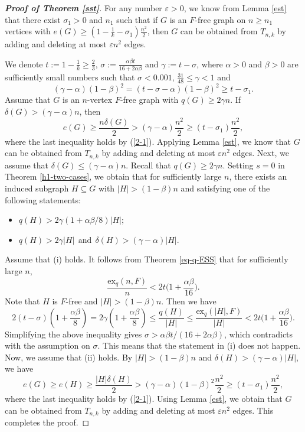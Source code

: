 \documentclass[11pt,a4paper]{article}
\theoremstyle{plain}
\theoremstyle{definition}
\begin{document}
\begin{proof}[{\bf Proof of Theorem \ref{sst}}]
For any number $\varepsilon>0$, we know from Lemma \ref{est} that there exist $\sigma_{1}>0$ and $n_{1}$ such that if
$G$ is an $F$-free graph on $n\ge n_1$ vertices with 
$e(G)\geq(1- \frac{1}{k} -\sigma_{1})\frac{n^{2}}{2}$, then
$G$ can be obtained from $T_{n,k}$ by adding and deleting at most $\varepsilon n^2$ edges.  

We denote $t:=1- \frac{1}{k}\geq \frac{2}{3}$, 
$ \sigma := \frac{\alpha\beta t}{16+2\alpha\beta}$ and $\gamma :=t-\sigma$, where $\alpha>0$ and $\beta>0$ are sufficiently small numbers such that $\sigma < 0.001$, $ \frac{31}{48}\le \gamma <1$ and  
\begin{equation}  \label{2-1}
    (\gamma -\alpha)(1-\beta)^{2} 
  = (t-\sigma - \alpha)(1- \beta)^2 \geq t-\sigma_{1}. 
\end{equation}  
Assume that $G$ is an $n$-vertex $F$-free graph with $q(G)\geq 2\gamma n$.  
If $\delta(G)>(\gamma-\alpha)n$, then
\[ e(G)\geq \frac{n\delta(G)}{2}> (\gamma-\alpha)\frac{n^{2}}{2}\geq (t-\sigma_{1}) \frac{n^{2}}{2}, \] 
where the last inequality holds by (\ref{2-1}).  
Applying  Lemma \ref{est}, we know that $G$ can be obtained from $T_{n,k}$ by adding and deleting at most $\varepsilon n^2$ edges. 
Next, we assume that $\delta(G)\leq(\gamma-\alpha)n$. Recall that $q(G)\geq2\gamma n$. Setting $s=0$ in Theorem \ref{h1-two-cases},  
we obtain that for sufficiently large $n$, there exists an induced subgraph $H\subseteq G$ with $|H|>(1-\beta) n$ and  satisfying
one of the following statements:
\begin{itemize}
\item[(i)]
$q(H)>2\gamma(1+\alpha\beta/8)|H|;$
\item[(ii)]
$q(H)>2\gamma |H|~~\mbox{and}~~\delta(H)>(\gamma-\alpha)|H|.$
\end{itemize}
Assume that (i) holds. It follows from Theorem \ref{eq-q-ESS} that for sufficiently large $n$, 
$$\frac{\mathrm{ex}_{q}(n,F)}{n}<2t \bigg(1+\frac{\alpha\beta }{16}\bigg).$$
 Note that $H$ is $F$-free and $|H|> (1- \beta )n$. Then we have 
$$2(t-\sigma)\left( 1+ \frac{\alpha\beta}{8} \right)=2\gamma 
\left(1+ \frac{\alpha\beta}{8} \right)\leq\frac{q(H)}{|H|}\leq
\frac{\mathrm{ex}_{q}(|H|,F)}{|H|}<2t \bigg(1+\frac{\alpha\beta}{16}\bigg).$$
Simplifying the above inequality gives  $\sigma>\alpha\beta t/(16+2\alpha\beta)$, which contradicts with the assumption on $\sigma$.  
This means that the statement in (i) does not happen. 
Now, we assume that (ii) holds.
By $|H|>(1-\beta)n$ and $\delta (H) > (\gamma - \alpha )|H|$, we have
$$e(G)\geq e(H)\geq \frac{|H|\delta(H)}{2}> (\gamma-\alpha)(1-\beta)^{2} \frac{n^{2}}{2}\geq (t-\sigma_{1}) \frac{n^{2}}{2},$$
where the last inequality holds by (\ref{2-1}). Using Lemma \ref{est}, we obtain that $G$ can be obtained from $T_{n,k}$ by adding and deleting at most $\varepsilon n^2$ edges. This completes the proof. 
\end{proof}
\end{document}
